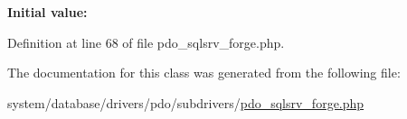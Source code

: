 {\bfseries Initial value\+:}
\begin{DoxyCode}{0}
\DoxyCodeLine{        \textcolor{stringliteral}{'TINYINT'}   => \textcolor{stringliteral}{'SMALLINT'},}
\DoxyCodeLine{        \textcolor{stringliteral}{'SMALLINT'}  => \textcolor{stringliteral}{'INT'},}
\DoxyCodeLine{        \textcolor{stringliteral}{'INT'}       => \textcolor{stringliteral}{'BIGINT'},}
\DoxyCodeLine{        \textcolor{stringliteral}{'REAL'}      => \textcolor{stringliteral}{'FLOAT'}}
\DoxyCodeLine{    )}

\end{DoxyCode}


Definition at line 68 of file pdo\+\_\+sqlsrv\+\_\+forge.\+php.



The documentation for this class was generated from the following file\+:\begin{DoxyCompactItemize}
\item 
system/database/drivers/pdo/subdrivers/\mbox{\hyperlink{pdo__sqlsrv__forge_8php}{pdo\+\_\+sqlsrv\+\_\+forge.\+php}}\end{DoxyCompactItemize}

